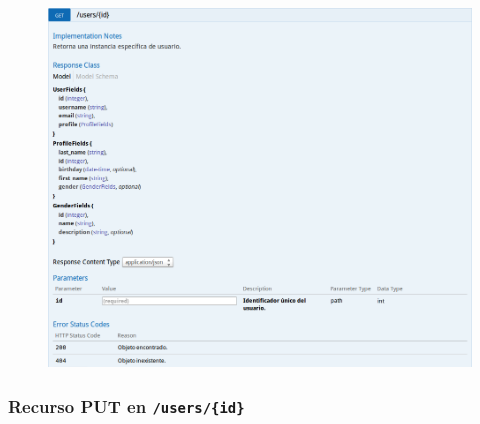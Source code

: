 \begin{figure}[h]
  \centering
  \includegraphics[width=\textwidth,height=.75\textheight,keepaspectratio]{img/especificacion_api/userView_get}
  \label{userView_get}
\end{figure}

\newpage


\subsubsection{Recurso PUT en \texttt{/users/\{id\}}}

